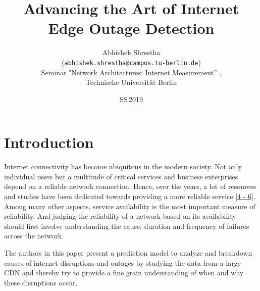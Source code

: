 \documentclass[11pt,twoside,a4paper]{article}
\begin{document}

\title{Advancing the Art of Internet Edge Outage Detection}
\author{Abhishek Shrestha \\
  (\texttt{abhishek.shrestha@campus.tu-berlin.de})\\[5mm]
  Seminar "Network Architectures: Internet Measurement'' , \\	%
 Technische Universit{\"a}t Berlin
}
  
\date{SS\,2019}

\maketitle

\section{Introduction}
 Internet connectivity has become ubiquitous in the modern society. Not only individual users but a multitude of critical services and business enterprises depend on a reliable network connection. Hence, over the years, a lot of resources and studies have been dedicated towards providing a more reliable service \hyperlink {K4}{[4 - 6]}. Among many other aspects, service availability is the most important measure of reliability. And judging the reliability of a network based on its availability should first involve understanding the cause, duration and frequency of failures across the network.
  
The authors in this paper present a prediction model to analyze and breakdown causes of internet disruptions and outages by studying the data from a large CDN and thereby try to provide a fine grain understanding of when and why these disruptions occur. 
\end{document}
